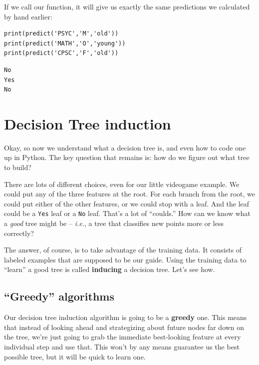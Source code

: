 \begin{samepage}
If we call our function, it will give us exactly the same predictions we
calculated by hand earlier:

\begin{Verbatim}[fontsize=\footnotesize,samepage=true,frame=single,framesep=3mm]
print(predict('PSYC','M','old'))
print(predict('MATH','O','young'))
print(predict('CPSC','F','old'))
\end{Verbatim}
\vspace{-.2in}

\begin{Verbatim}[fontsize=\footnotesize,samepage=true,frame=leftline,framesep=5mm,framerule=1mm]
No
Yes
No
\end{Verbatim}
\end{samepage}

\section{Decision Tree induction}

Okay, so now we understand what a decision tree is, and even how to code one up
in Python. The key question that remains is: how do we figure out what tree to
build?

There are lots of different choices, even for our little videogame example. We
could put any of the three features at the root. For each branch from the root,
we could put either of the other features, or we could stop with a leaf. And
the leaf could be a \texttt{Yes} leaf or a \texttt{No} leaf. That's a lot of
``coulds.'' How can we know what a \textit{good} tree might be --
\textit{i.e.}, a tree that classifies new points more or less correctly?


The answer, of course, is to take advantage of the training data. It consists
of labeled examples that are supposed to be our guide. Using the training data
to ``learn'' a good tree is called \textbf{inducing} a decision tree. Let's see
how.

\subsection{``Greedy'' algorithms}


Our decision tree induction algorithm is going to be a \textbf{greedy} one.
This means that instead of looking ahead and strategizing about future nodes
far down on the tree, we're just going to grab the immediate best-looking
feature at every individual step and use that. This won't by any means
guarantee us the best possible tree, but it will be quick to learn one.

